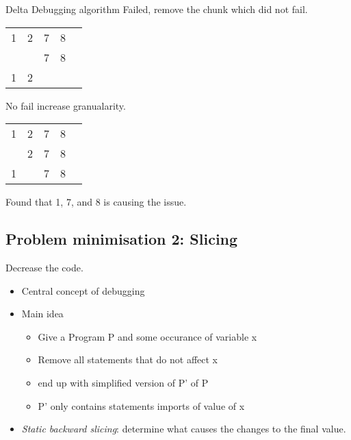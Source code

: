 \begin{exampleblock}{Delta Debugging algorithm}
    Failed, remove the chunk which did not fail.
    \begin{center}
        \begin{tabular}{ c c|c c c}
         1 & 2 & 7 & 8 \\ 
         \color{lightgray}{1} & \color{lightgray}{2} & 7 & 8 & \color{green}{\checkmark} \\ 
         1 & 2 & \color{lightgray}{7} & \color{lightgray}{8} & \color{green}{\checkmark} \\ 
        \end{tabular}
    \end{center}

    No fail increase granualarity.
    \begin{center}
        \begin{tabular}{ c|c|c|c c}
         1 & 2 & 7 & 8 \\ 
         \color{lightgray}{1} & 2 & 7 & 8 & \color{green}{\checkmark} \\ 
         1 & \color{lightgray}{2} & 7 & 8 & \color{red}{x} \\ 
        \end{tabular}
    \end{center}

    Found that 1, 7, and 8 is causing the issue.
    
\end{exampleblock}


\subsection{Problem minimisation 2: Slicing}
Decrease the code.

\begin{itemize}
    \item Central concept of debugging
    \item Main idea
    \begin{itemize}
        \item Give a Program P and some occurance of variable x
        \item Remove all statements that do not affect x
        \item end up with simplified version of P' of P 
        \item P' only contains statements imports of value of x
    \end{itemize}
    \item \textit{Static backward slicing}: determine what causes the changes to the final value.
\end{itemize}


